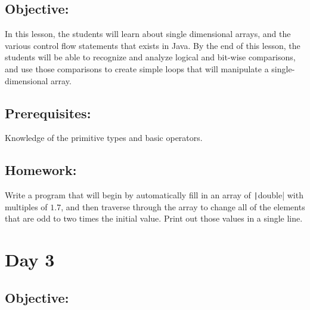 \documentclass[11pt,fleqn]{article}
\newcommand{\mil}[2][java]{\texttt|#2|}
\begin{document}
\subsection*{Objective:} In this lesson, the students will learn about single dimensional arrays, and the various control flow statements that exists in Java. By the end of this lesson, the students will be able to recognize and analyze logical and bit-wise comparisons, and use those comparisons to create simple loops that will manipulate a single-dimensional array.
\subsection*{Prerequisites:} Knowledge of the primitive types and basic operators.  

\subsection*{Homework:} Write a program that will begin by automatically fill in an array of \mil{double} with multiples of $1.7$, and then traverse through the array to change all of the elements that are odd to two times the initial value. Print out those values in a single line.

\section*{Day 3}
\subsection*{Objective:} 
\end{document}
